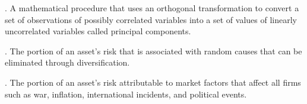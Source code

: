 \documentclass[oneside,12pt]{report}
\begin{document}
\vspace{12pt} 

\vspace{8pt}
.  A mathematical procedure that uses an orthogonal transformation to convert a set of observations of possibly correlated variables into a set of values of linearly uncorrelated variables called principal components. 

\vspace{8pt}
. The portion of an asset’s risk that is associated with random causes that can be eliminated through diversification. 

\vspace{8pt}
. The portion of an asset’s risk attributable to market factors that affect all firms such as war, inflation, international incidents, and political events. 

%
%
%
%
%
%
%


\end{document}
